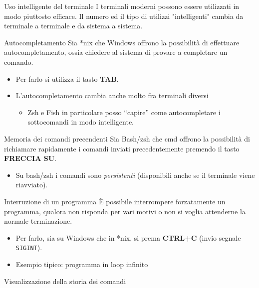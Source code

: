 \documentclass[xcolor=dvipsnames,presentation]{beamer}
\begin{document}
\begin{frame}{Uso intelligente del terminale}
    I terminali moderni possono essere utilizzati in modo piuttosto efficace.
    Il numero ed il tipo di utilizzi "intelligenti" cambia da terminale a terminale e da sistema a sistema.
    \begin{block}{Autocompletamento}
        \scriptsize{}
        Sia *nix che Windows offrono la possibilità di effettuare autocompletamento, ossia chiedere al sistema di provare a completare un comando.
        \begin{itemize}
            \item Per farlo si utilizza il tasto \textbf{TAB}.
            \item L'autocompletamento cambia anche molto fra terminali diversi
            \begin{itemize}
                \scriptsize{}
                \item Zsh e Fish in particolare posso ``capire'' come autocompletare i sottocomandi in modo intelligente.
            \end{itemize}
        \end{itemize}
    \end{block}
    \begin{block}{Memoria dei comandi precendenti}
        \scriptsize{}
        Sia Bash/zsh che cmd offrono la possibilità di richiamare rapidamente i comandi inviati precedentemente premendo il tasto \textbf{FRECCIA SU}.
        \begin{itemize}
            \item  Su bash/zsh i comandi sono \emph{persistenti} (disponibili anche se il terminale viene riavviato).
        \end{itemize}
    \end{block}
    \begin{block}{Interruzione di un programma}
        \scriptsize{}
        È possibile interrompere forzatamente un programma, qualora non risponda per vari motivi o non si voglia attenderne la normale terminazione.
        \begin{itemize}
            \item Per farlo, sia su Windows che in *nix, si prema \textbf{CTRL+C} (invio segnale \texttt{SIGINT}).
            \item Esempio tipico: programma in loop infinito
        \end{itemize}
    \end{block}
    \begin{block}{Visualizzazione della storia dei comandi}

\end{block}
\end{frame}
\end{document}

